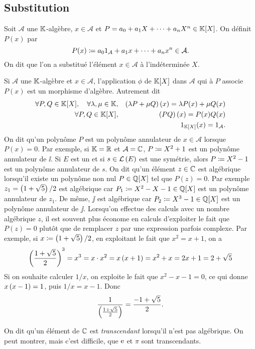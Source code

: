 \documentclass{magnolia}
\begin{document}
\subsection{Substitution}

\begin{definition}
Soit $\mathcal{A}$ une $\mathbb{K}$-algèbre, $x\in\mathcal{A}$ et
$P=a_0+a_1X+\cdots+a_nX^n\in\polyK$. On définit $P(x)$ par
\[P(x)\coloneqq a_0 1_{\mathcal{A}}+a_1 x+\cdots+a_n x^n\in\mathcal{A}.\]
On dit que l'on a substitué l'élément $x\in\mathcal{A}$ à l'indéterminée $X$.
\end{definition}

\begin{remarques}
\remarque Si $\mathcal{A}$ une $\mathbb{K}$-algèbre et $x\in\mathcal{A}$,
  l'application $\phi$ de $\polyK$ dans $\mathcal{A}$ qui à $P$ associe
  $P(x)$ est un morphisme d'algèbre. Autrement dit
  \begin{eqnarray*}
  \forall P,Q\in\polyK \qsep \forall \lambda,\mu\in\K, & &
    \p{\lambda P+\mu Q}(x)=\lambda P(x)+\mu Q(x)\\
  \forall P,Q\in\polyK, & &
    \p{PQ}(x)=P(x)Q(x)\\
  & & 1_{\polyK}(x)=1_{\mathcal{A}}.
  \end{eqnarray*}
\remarque On dit qu'un polynôme $P$ est un polynôme annulateur de
  $x\in\mathcal{A}$ lorsque $P(x)=0$. Par exemple, si $\mathbb{K}=\mathbb{R}$ et
  $\mathcal{A}=\mathbb{C}$, $P\coloneqq X^2+1$ est un polynôme annulateur de $\ii$. Si $E$
  est un \Kev et si $s\in\mathcal{L}\left(E\right)$ est une symétrie, alors $P\coloneqq X^2-1$ est un
  polynôme annulateur de $s$.
\remarque On dit qu'un élément $z\in\mathbb{C}$ est algébrique lorsqu'il existe un polynôme
  non nul $P\in\polyQ$ tel que $P(z)=0$. Par exemple $z_1=\left(1+\sqrt{5}\right)/2$
  est algébrique car $P_1\defeq X^2-X-1\in\polyQ$
  est un polynôme annulateur de $z_1$. De même,
  $\jj$ est algébrique car $P_2\defeq X^3-1\in\polyQ$
  est un polynôme annulateur de $\jj$. Lorsqu'on
  effectue des calculs avec un nombre algébrique $z$, il est souvent plus économe en
  calculs d'exploiter le fait que $P(z)=0$ plutôt que de remplacer $z$ par une
  expression parfois complexe. Par exemple, si $x\coloneqq\left(1+\sqrt{5}\right)/2$, en exploitant le fait que
  $x^2=x+1$, on a
  \[\left(\frac{1+\sqrt{5}}{2}\right)^3
    =x^3=x\cdot x^2=x\left(x+1\right)=x^2+x=2x+1=2+\sqrt{5}\]
  Si on souhaite calculer $1/x$, on exploite le fait que $x^2-x-1=0$, ce qui donne $x\left(x-1\right)=1$, puis $1/x=x-1$. Donc
  \[\frac{1}{\left(\frac{1+\sqrt{5}}{2}\right)}=\frac{-1+\sqrt{5}}{2}.\]

\remarque On dit qu'un élément de $\mathbb{C}$ est \emph{transcendant} lorsqu'il n'est pas
  algébrique. On peut montrer, mais c'est difficile, que ${\rm e}$ et $\pi$ sont
  transcendants.
\end{remarques}
\end{document}
